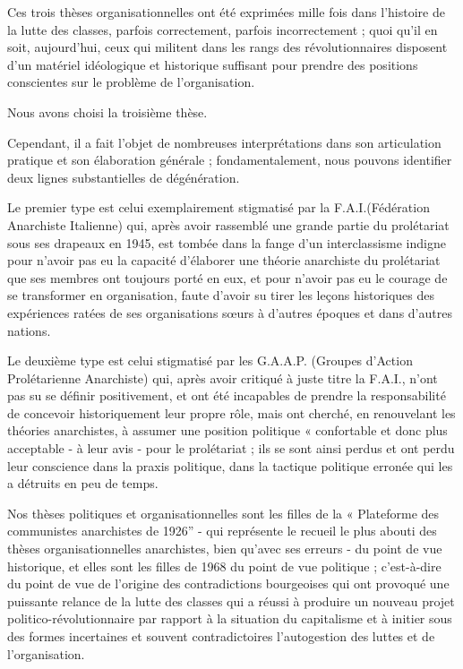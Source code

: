 Ces trois thèses organisationnelles ont été exprimées mille fois dans l'histoire de la lutte des classes, parfois correctement, parfois incorrectement ; quoi qu'il en soit, aujourd'hui, ceux qui militent dans les rangs des révolutionnaires disposent d'un matériel idéologique et historique suffisant pour prendre des positions conscientes sur le problème de l'organisation.

Nous avons choisi la troisième thèse.

Cependant, il a fait l'objet de nombreuses interprétations dans son articulation pratique et son élaboration générale ; fondamentalement, nous pouvons identifier deux lignes substantielles de dégénération.

Le premier type est celui exemplairement stigmatisé par la F.A.I.(Fédération Anarchiste Italienne) qui, après avoir rassemblé une grande partie du prolétariat sous ses drapeaux en 1945, est tombée dans la fange d'un interclassisme indigne pour n'avoir pas eu la capacité d'élaborer une théorie anarchiste du prolétariat que ses membres ont toujours porté en eux, et pour n'avoir pas eu le courage de se transformer en organisation, faute d'avoir su tirer les leçons historiques des expériences ratées de ses organisations sœurs à d'autres époques et dans d'autres nations.

Le deuxième type est celui stigmatisé par les G.A.A.P. (Groupes d'Action Prolétarienne Anarchiste) qui, après avoir critiqué à juste titre la F.A.I., n'ont pas su se définir positivement, et ont été incapables de prendre la responsabilité de concevoir historiquement leur propre rôle, mais ont cherché, en renouvelant les théories anarchistes, à assumer une position politique « confortable et donc plus acceptable - à leur avis - pour le prolétariat ; ils se sont ainsi perdus et ont perdu leur conscience dans la praxis politique, dans la tactique politique erronée qui les a détruits en peu de temps.

Nos thèses politiques et organisationnelles sont les filles de la « Plateforme des communistes anarchistes de 1926'' - qui représente le recueil le plus abouti des thèses organisationnelles anarchistes, bien qu'avec ses erreurs - du point de vue historique, et elles sont les filles de 1968 du point de vue politique ; c'est-à-dire du point de vue de l'origine des contradictions bourgeoises qui ont provoqué une puissante relance de la lutte des classes qui a réussi à produire un nouveau projet politico-révolutionnaire par rapport à la situation du capitalisme et à initier sous des formes incertaines et souvent contradictoires l'autogestion des luttes et de l'organisation.

